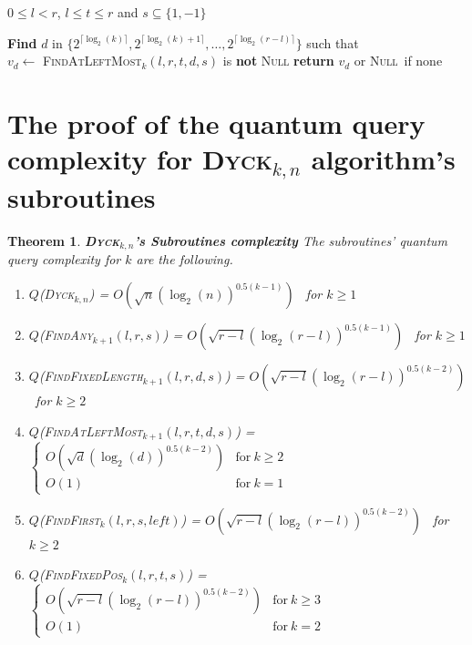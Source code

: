 \documentclass[11pt,a4paper]{article}
\newcommand{\Dyck}[1]{\textsc{Dyck$_{#1}$}}
\newcommand{\FA}[1]{\textsc{FindAny$_{#1}$}}
\newcommand{\FFL}[1]{\textsc{FindFixedLength$_{#1}$}}
\newcommand{\FFP}[1]{\textsc{FindFixedPos$_{#1}$}}
\newcommand{\FALM}[1]{\textsc{FindAtLeftMost$_{#1}$}}
\newcommand{\FF}[1]{\textsc{FindFirst$_{#1}$}}
\newcommand{\Null}{\textsc{Null}}
\theoremstyle{definition}
\theoremstyle{plain}
\newtheorem{theorem}{Theorem}[section]
\theoremstyle{definition}
\begin{document}
\begin{appendix}
    \begin{algorithm}
        \caption{$\FFP{k}(l,r,t,s)$}\label{alg:ffp}
        \begin{algorithmic}
            \Require $0\leq l<r$, $l \leq t \leq r$ and $s \subseteq \{1, -1\}$

            \State \textbf{Find} $d$ in $\{2^{\lceil \log_2(k)\rceil }, 2^{\lceil \log_2(k)+1\rceil },\ldots,2^{\lceil \log_2(r-l)\rceil }\}$
            such that \\
            \hspace*{1cm} $v_d \gets $ \FALM{k}$(l,r,t,d,s)$ is \textbf{not} \Null
            \State \textbf{return} $v_d$ or \Null \ if none
        \end{algorithmic}
    \end{algorithm}

    \section{The proof of the quantum query complexity for \Dyck{k,n} algorithm's subroutines}
    \label{proof:complexity_dyckkn}

    \begin{theorem}{\textbf{\Dyck{k,n}'s Subroutines complexity}} \label{th:subroutine_complexity}
        The subroutines' quantum query complexity for $k$ are the following.
        \begin{enumerate}
            \item $Q$(\Dyck{k,n}) = $O\left(\sqrt{n}(\log_2(n))^{0.5(k-1)}\right)$ \ for $k \geq 1$
            \item $Q$(\FA{k+1}$(l,r,s)$) = $O\left(\sqrt{r-l}(\log_2(r-l))^{0.5(k-1)}\right)$ \ for $k \geq 1$
            \item $Q$(\FFL{k+1}$(l,r,d,s)$) = $O\left(\sqrt{r-l}(\log_2(r-l))^{0.5(k-2)}\right)$ \ for $k \geq 2$
            \item $Q$(\FALM{k+1}$(l, r, t, d, s)$) = $\left\{
                      \begin{array}{ll}
                          O\left(\sqrt{d}(\log_2(d))^{0.5(k-2)}\right) & \textrm{for} \ k \geq 2 \\
                          O(1)                                         & \textrm{for} \  k = 1
                      \end{array}
                      \right.$
            \item $Q$(\FF{k}$(l,r,s, left)$) = $O\left(\sqrt{r-l}(\log_2(r-l))^{0.5(k-2)}\right)$ \ for $k \geq 2$
            \item $Q$(\FFP{k}$(l,r,t,s)$) = $\left\{ \begin{array}{ll}
                          O\left(\sqrt{r-l}(\log_2(r-l))^{0.5(k-2)}\right) & \textrm{for} \ k \geq 3 \\
                          O(1)                                             & \textrm{for} \ k = 2
                      \end{array}
                      \right.$
        \end{enumerate}
    \end{theorem}


\end{appendix}
\end{document}
